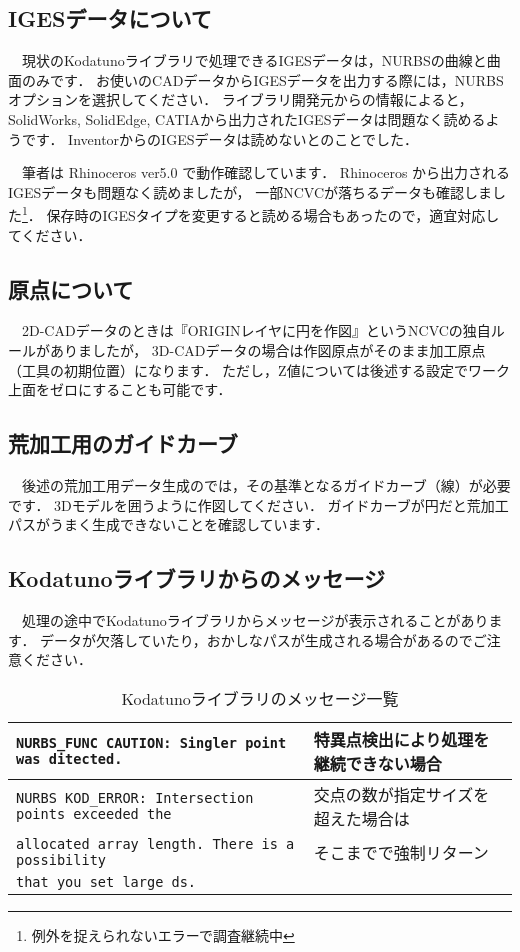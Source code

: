 \subsection{IGESデータについて}
　現状のKodatunoライブラリで処理できるIGESデータは，NURBSの曲線と曲面のみです．
お使いのCADデータからIGESデータを出力する際には，NURBSオプションを選択してください．
ライブラリ開発元からの情報によると，SolidWorks, SolidEdge, CATIAから出力されたIGESデータは問題なく読めるようです．
InventorからのIGESデータは読めないとのことでした．

　筆者は Rhinoceros ver5.0 で動作確認しています．
Rhinoceros から出力されるIGESデータも問題なく読めましたが，
一部NCVCが落ちるデータも確認しました\footnote{例外を捉えられないエラーで調査継続中}．
保存時のIGESタイプを変更すると読める場合もあったので，適宜対応してください．

\subsection{原点について}
　2D-CADデータのときは『ORIGINレイヤに円を作図』というNCVCの独自ルールがありましたが，
3D-CADデータの場合は作図原点がそのまま加工原点（工具の初期位置）になります．
ただし，Z値については後述する設定でワーク上面をゼロにすることも可能です．

\subsection{荒加工用のガイドカーブ}
　後述の荒加工用データ生成のでは，その基準となるガイドカーブ（線）が必要です．
3Dモデルを囲うように作図してください．
ガイドカーブが円だと荒加工パスがうまく生成できないことを確認しています．

\subsection{Kodatunoライブラリからのメッセージ}
　処理の途中でKodatunoライブラリからメッセージが表示されることがあります．
データが欠落していたり，おかしなパスが生成される場合があるのでご注意ください．

\begin{table}[H]
\centering
\caption{Kodatunoライブラリのメッセージ一覧}
\label{tab:kodatuno_msg}
\begin{tabular}{l|l}
\hline
\texttt{NURBS\_FUNC CAUTION: Singler point was ditected.} & 特異点検出により処理を継続できない場合 \\ \hline
\texttt{NURBS KOD\_ERROR: Intersection points exceeded the} & 交点の数が指定サイズを超えた場合は \\
\texttt{allocated array length. There is a possibility} & そこまでで強制リターン \\
\texttt{that you set large ds.} & \\ \hline
\end{tabular}
\end{table}

